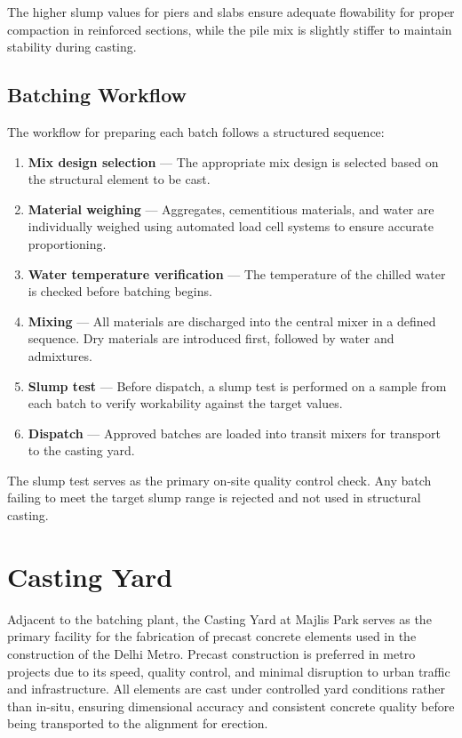 \par\noindent
The higher slump values for piers and slabs ensure adequate flowability for proper compaction in reinforced sections, while the pile mix is slightly stiffer to maintain stability during casting.

\subsection{Batching Workflow}
\par\noindent
The workflow for preparing each batch follows a structured sequence:
\begin{enumerate}
    \item \textbf{Mix design selection} --- The appropriate mix design is selected based on the structural element to be cast.
    \item \textbf{Material weighing} --- Aggregates, cementitious materials, and water are individually weighed using automated load cell systems to ensure accurate proportioning.
    \item \textbf{Water temperature verification} --- The temperature of the chilled water is checked before batching begins.
    \item \textbf{Mixing} --- All materials are discharged into the central mixer in a defined sequence. Dry materials are introduced first, followed by water and admixtures.
    \item \textbf{Slump test} --- Before dispatch, a slump test is performed on a sample from each batch to verify workability against the target values.
    \item \textbf{Dispatch} --- Approved batches are loaded into transit mixers for transport to the casting yard.
\end{enumerate}

\par\noindent
The slump test serves as the primary on-site quality control check. Any batch failing to meet the target slump range is rejected and not used in structural casting.

\section{Casting Yard}
\par\noindent
Adjacent to the batching plant, the Casting Yard at Majlis Park serves as the primary facility for the fabrication of precast concrete elements used in the construction of the Delhi Metro. Precast construction is preferred in metro projects due to its speed, quality control, and minimal disruption to urban traffic and infrastructure. All elements are cast under controlled yard conditions rather than in-situ, ensuring dimensional accuracy and consistent concrete quality before being transported to the alignment for erection.


